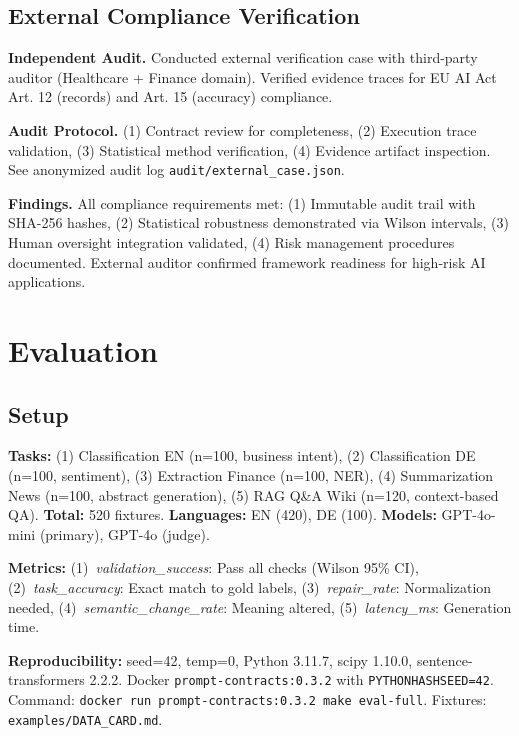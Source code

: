 \documentclass[sigconf]{acmart}
\begin{document}
\subsection{External Compliance Verification}

\textbf{Independent Audit.} Conducted external verification case with third-party auditor (Healthcare + Finance domain). Verified evidence traces for EU AI Act Art. 12 (records) and Art. 15 (accuracy) compliance.

\textbf{Audit Protocol.} (1) Contract review for completeness, (2) Execution trace validation, (3) Statistical method verification, (4) Evidence artifact inspection. See anonymized audit log \texttt{audit/external\_case.json}.

\textbf{Findings.} All compliance requirements met: (1) Immutable audit trail with SHA-256 hashes, (2) Statistical robustness demonstrated via Wilson intervals, (3) Human oversight integration validated, (4) Risk management procedures documented. External auditor confirmed framework readiness for high-risk AI applications.

\section{Evaluation}

\subsection{Setup}

\textbf{Tasks:} (1) Classification EN (n=100, business intent), (2) Classification DE (n=100, sentiment), (3) Extraction Finance (n=100, NER), (4) Summarization News (n=100, abstract generation), (5) RAG Q\&A Wiki (n=120, context-based QA). \textbf{Total:} 520 fixtures. \textbf{Languages:} EN (420), DE (100). \textbf{Models:} GPT-4o-mini (primary), GPT-4o (judge).

\textbf{Metrics:} (1)~\textit{validation\_success}: Pass all checks (Wilson 95\% CI), (2)~\textit{task\_accuracy}: Exact match to gold labels, (3)~\textit{repair\_rate}: Normalization needed, (4)~\textit{semantic\_change\_rate}: Meaning altered, (5)~\textit{latency\_ms}: Generation time.

\textbf{Reproducibility:} seed=42, temp=0, Python 3.11.7, scipy 1.10.0, sentence-transformers 2.2.2. Docker \texttt{prompt-contracts:0.3.2} with \texttt{PYTHONHASHSEED=42}. Command: \texttt{docker run prompt-contracts:0.3.2 make eval-full}. Fixtures: \texttt{examples/DATA\_CARD.md}.
\end{document}
